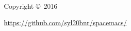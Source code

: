 \documentclass[10pt,english,landscape]{article}
\begin{document}
\begin{multicols}{3}
Copyright \copyright\ 2016


\href{https://github.com/syl20bnr/spacemacs/}{https://github.com/syl20bnr/spacemacs/}


\end{multicols}
\end{document}
